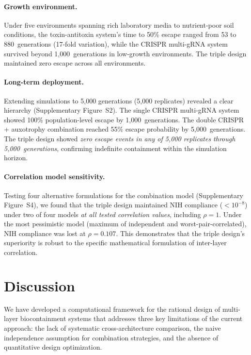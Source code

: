 \documentclass[journal=asbcd6,manuscript=article]{achemso}
\begin{document}
\paragraph{Growth environment.} Under five environments spanning rich laboratory media to nutrient-poor soil conditions, the toxin-antitoxin system's time to 50\% escape ranged from 53 to 880~generations (17-fold variation), while the CRISPR multi-gRNA system survived beyond 1,000~generations in low-growth environments. The triple design maintained zero escape across all environments.

\paragraph{Long-term deployment.} Extending simulations to 5,000 generations (5,000 replicates) revealed a clear hierarchy (Supplementary Figure~S2). The single CRISPR multi-gRNA system showed 100\% population-level escape by 1,000~generations. The double CRISPR + auxotrophy combination reached 55\% escape probability by 5,000~generations. The triple design showed \emph{zero escape events in any of 5,000 replicates through 5,000~generations}, confirming indefinite containment within the simulation horizon.

\paragraph{Correlation model sensitivity.} Testing four alternative formulations for the combination model (Supplementary Figure~S4), we found that the triple design maintained NIH compliance ($<$$10^{-8}$) under two of four models \emph{at all tested correlation values}, including $\rho = 1$. Under the most pessimistic model (maximum of independent and worst-pair-correlated), NIH compliance was lost at $\rho = 0.107$. This demonstrates that the triple design's superiority is robust to the specific mathematical formulation of inter-layer correlation.

\section{Discussion}

We have developed a computational framework for the rational design of multi-layer biocontainment systems that addresses three key limitations of the current approach: the lack of systematic cross-architecture comparison, the naive independence assumption for combination strategies, and the absence of quantitative design optimization.
\end{document}
